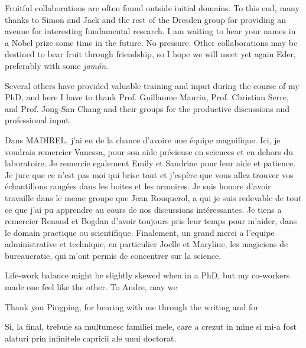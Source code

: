 Fruitful collaborations are often found outside initial domains. 
To this end, many thanks to Simon and Jack and the rest of the Dresden 
group for providing an avenue for interesting fundamental research.
I am waiting to hear your names in a Nobel prize some time in the
future. No pressure. Other collaborations may be destined to bear fruit
through friendship, so I hope we will meet yet again Eder, preferably 
with some \textit{jamón}.

Several others have provided valuable training and input during the 
course of my PhD, and here I have to thank Prof. Guillaume Maurin,
Prof. Christian Serre, and Prof. Jong-San Chang and their groups
for the productive discussions and professional input.

Dans MADIREL, j'ai eu de la chance d'avoire une équipe magnifique.
Ici, je voudrais remercier Vanessa, pour son aide précieuse en sciences
et en dehors du laboratoire.
Je remercie egalement Emily et Sandrine pour leur aide et patience.
Je jure que ce n'est pas moi qui brise tout et j'espère que vous allez
trouver vos échantillons  rangées dans les boites 
et les armoires. Je suis honore d'avoir travaille dans le meme groupe 
que Jean Rouquerol, a qui je suis redevable de tout ce que j'ai pu apprendre
au cours de nos discussions intéressantes. Je tiens a remercier 
Renaud et Bogdan d'avoir toujours pris leur temps pour m'aider,
dans le domain practique ou scientifique. 
Finalement, un grand merci a l'equipe administrative et technique,
en particulier Joelle et Maryline, les magiciens de bureaucratie, qui 
m'ont permis de concentrer sur la science.

Life-work balance might be slightly skewed when in a PhD, but my
co-workers made one feel like the other. 
To Andre, may we 

Thank you Pingping, for bearing with me through the writing and for 

Si, la final, trebuie sa multumesc familiei mele, care a crezut in mine si
mi-a fost alaturi prin infinitele capricii ale unui doctorat.